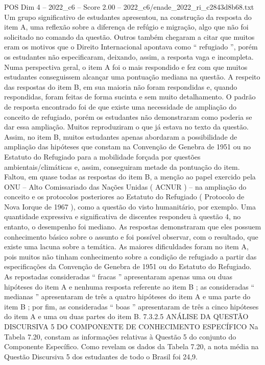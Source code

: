 \begin{textsample}{POS Dim 4 – 2022\_c6 – Score 2.00 – 2022\_c6/enade\_2022\_ri\_c2843d8b68.txt}
Um grupo significativo de estudantes apresentou, na construção da resposta do item A, uma reflexão sobre a diferença de refúgio e migração, algo que não foi solicitado no comando da questão.
Outros também chegaram a citar que muitos eram os motivos que o Direito Internacional apontava como “ refugiado ”, porém os estudantes não especificaram, deixando, assim, a resposta vaga e incompleta.
Numa perspectiva geral, o item A foi o mais respondido e fez com que muitos estudantes conseguissem alcançar uma pontuação mediana na questão.
A respeito das respostas do item B, em sua maioria não foram respondidas e, quando respondidas, foram feitas de forma sucinta e sem muito detalhamento.
O padrão de resposta encontrado foi de que existe uma necessidade de ampliação do conceito de refugiado, porém os estudantes não demonstraram como poderia se dar essa ampliação.
Muitos reproduziram o que já estava no texto da questão.
Assim, no item B, muitos estudantes apenas abordaram a possibilidade de ampliação das hipóteses que constam na Convenção de Genebra de 1951 ou no Estatuto do Refugiado para a mobilidade forçada por questões ambientais/climáticas e, assim, conseguiram metade da pontuação do item.
Faltou, em quase todas as respostas do item B, a menção ao papel exercido pela ONU – Alto Comissariado das Nações Unidas ( ACNUR ) – na ampliação do conceito e os protocolos posteriores ao Estatuto do Refugiado ( Protocolo de Nova Iorque de 1967 ), como a questão do visto humanitário, por exemplo.
Uma quantidade expressiva e significativa de discentes respondeu à questão 4, no entanto, o desempenho foi mediano.
As respostas demonstraram que eles possuem conhecimento básico sobre o assunto e foi possível observar, com o resultado, que existe uma lacuna sobre a temática.
As maiores dificuldades foram no item A, pois muitos não tinham conhecimento sobre a condição de refugiado a partir das especificações da Convenção de Genebra de 1951 ou do Estatuto do Refugiado.
As repostadas consideradas “ fracas ” apresentaram apenas uma ou duas hipóteses do item A e nenhuma resposta referente ao item B ; as consideradas “ medianas ” apresentaram de três a quatro hipóteses do item A e uma parte do item B ; por fim, as consideradas “ boas ” apresentaram de três a cinco hipóteses do item A e uma ou duas partes do item B. 7.3.2.5 ANÁLISE DA QUESTÃO DISCURSIVA 5 DO COMPONENTE DE CONHECIMENTO ESPECÍFICO Na Tabela 7.20, constam as informações relativas à Questão 5 do conjunto do Componente Específico.
Como revelam os dados da Tabela 7.20, a nota média na Questão Discursiva 5 dos estudantes de todo o Brasil foi 24,9.

\end{textsample}
